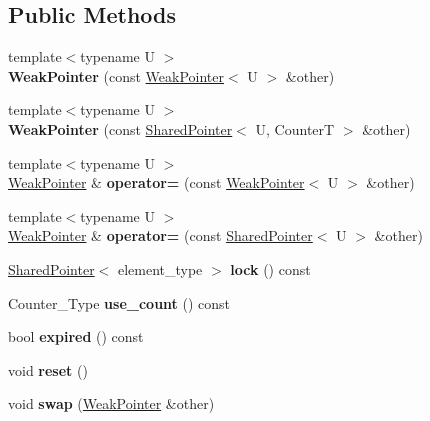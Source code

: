\subsection*{Public Methods}
\begin{DoxyCompactItemize}
\item 
\mbox{\label{classcugar_1_1_weak_pointer_a3cfe11ef32bb82dc632ca2fe35663911}} 
{\footnotesize template$<$typename U $>$ }\\{\bfseries Weak\+Pointer} (const \hyperlink{classcugar_1_1_weak_pointer}{Weak\+Pointer}$<$ U $>$ \&other)
\item 
\mbox{\label{classcugar_1_1_weak_pointer_a19651964946b8d3aeec2758fa7628925}} 
{\footnotesize template$<$typename U $>$ }\\{\bfseries Weak\+Pointer} (const \hyperlink{classcugar_1_1_shared_pointer}{Shared\+Pointer}$<$ U, CounterT $>$ \&other)
\item 
\mbox{\label{classcugar_1_1_weak_pointer_a741feaa01a7cd545698630dffc352b18}} 
{\footnotesize template$<$typename U $>$ }\\\hyperlink{classcugar_1_1_weak_pointer}{Weak\+Pointer} \& {\bfseries operator=} (const \hyperlink{classcugar_1_1_weak_pointer}{Weak\+Pointer}$<$ U $>$ \&other)
\item 
\mbox{\label{classcugar_1_1_weak_pointer_a87d9bb88e2bf842ee631d07c2c2303e1}} 
{\footnotesize template$<$typename U $>$ }\\\hyperlink{classcugar_1_1_weak_pointer}{Weak\+Pointer} \& {\bfseries operator=} (const \hyperlink{classcugar_1_1_shared_pointer}{Shared\+Pointer}$<$ U $>$ \&other)
\item 
\mbox{\label{classcugar_1_1_weak_pointer_a9be1ca97673c2fbf680acf24000a3d18}} 
\hyperlink{classcugar_1_1_shared_pointer}{Shared\+Pointer}$<$ element\+\_\+type $>$ {\bfseries lock} () const
\item 
\mbox{\label{classcugar_1_1_weak_pointer_a51c84b884be51777d1e05ca5f51cdc52}} 
Counter\+\_\+\+Type {\bfseries use\+\_\+count} () const
\item 
\mbox{\label{classcugar_1_1_weak_pointer_acdece2d64c0062cbaba862b6d066f8c5}} 
bool {\bfseries expired} () const
\item 
\mbox{\label{classcugar_1_1_weak_pointer_aa52aa750c80a5a13569c4e67aa2d979e}} 
void {\bfseries reset} ()
\item 
\mbox{\label{classcugar_1_1_weak_pointer_a4340244dfd25b8a04a80d8331111dcf4}} 
void {\bfseries swap} (\hyperlink{classcugar_1_1_weak_pointer}{Weak\+Pointer} \&other)
\end{DoxyCompactItemize}
